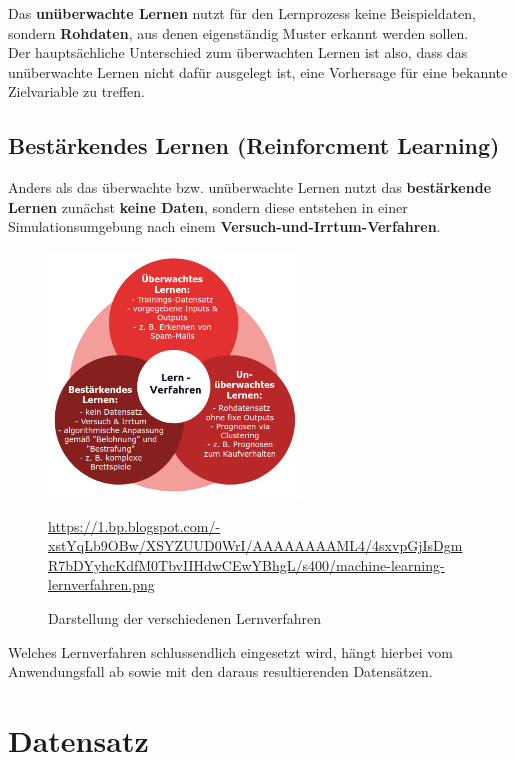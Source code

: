	Das \textbf{unüberwachte Lernen} nutzt für den Lernprozess keine Beispieldaten, sondern \textbf{Rohdaten}, aus denen eigenständig Muster erkannt werden sollen. \\
	Der hauptsächliche Unterschied zum überwachten Lernen ist also, dass das unüberwachte Lernen nicht dafür ausgelegt ist, eine Vorhersage für eine bekannte Zielvariable zu treffen. \cite{datasolut3}
	
\subsection{Bestärkendes Lernen (Reinforcment Learning)}

	Anders als das überwachte bzw. unüberwachte Lernen nutzt das \textbf{bestärkende Lernen} zunächst \textbf{keine Daten}, sondern diese entstehen in einer Simulationsumgebung nach einem \textbf{Versuch-und-Irrtum-Verfahren}. \cite{der-onliner_blogspot}
	
\begin{figure}[H]
	\centering
	\includegraphics[width=0.6\textwidth]{kapitel3/images/lernverfahren.png}
	\label{fig:machine-learning-algorithms}
	\caption{Darstellung der verschiedenen Lernverfahren}
	\vspace{0.2cm}
	\quelle\url{https://1.bp.blogspot.com/-xstYqLb9OBw/XSYZUUD0WrI/AAAAAAAAML4/4sxvpGjIsDgmR7bDYyhcKdfM0TbvIIHdwCEwYBhgL/s400/machine-learning-lernverfahren.png}
\end{figure}

Welches Lernverfahren schlussendlich eingesetzt wird, hängt hierbei vom Anwendungsfall ab sowie mit den daraus resultierenden Datensätzen.

\section{Datensatz}

